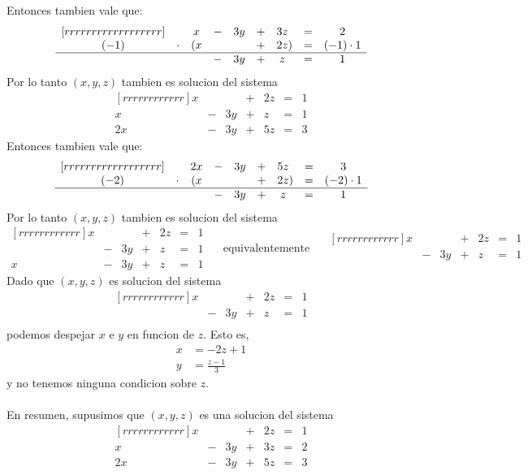 \documentclass{article}
\theoremstyle{definition}
\theoremstyle{definition}
\theoremstyle{remark}
\begin{document}
Entonces tambien vale que: 
\[
 \begin{matrix}[rrrrrrrrrrrrrrrrrr]
&& x & - & 3y & + & 3z\phantom{)} & = & 2 \\
    (-1) & \cdot &(x & &  & + & 2z ) & = & (-1) \cdot 1 \\
    \hline 
         & &  & - &  3y& + &  z\phantom{)} & = & 1
  \end{matrix}
\]
Por lo tanto $(x,y,z)$ tambien es solucion del sistema \[
\begin{matrix}[rrrrrrrrrrrr]
     x  &   &    & + & 2z & = & 1  \\
     x  & - & 3y & + & z & = & 1 \\
     2x & - & 3y & + & 5z & = & 3
  \end{matrix}
\]
Entonces tambien vale que: \[
 \begin{matrix}[rrrrrrrrrrrrrrrrrr]
&& 2x & - & 3y & + & 5z\phantom{)} & = & 3 \\
    (-2) & \cdot &(x & &  & + & 2z ) & = & (-2) \cdot 1 \\
    \hline 
         & &  & - &  3y& + &  z\phantom{)} & = & 1
  \end{matrix}
\]
Por lo tanto $(x,y,z)$ tambien es solucion del sistema \[
\begin{matrix}[rrrrrrrrrrrr]
     x  &   &    & + & 2z & = & 1  \\
       & - & 3y & + & z & = & 1 \\
    x & - & 3y & + & z & = & 1
  \end{matrix} \quad \text{ equivalentemente } \quad \begin{matrix}[rrrrrrrrrrrr]
     x  &   &    & + & 2z & = & 1  \\
       & - & 3y & + & z & = & 1 \\
     \end{matrix} 
\]
Dado que $(x,y,z)$ es solucion del sistema \[\begin{matrix}[rrrrrrrrrrrr]
     x  &   &    & + & 2z & = & 1  \\
       & - & 3y & + & z & = & 1 \\
     \end{matrix} 
\]
podemos despejar $x$ e $y$ en funcion de $z$. Esto es, \[
  \begin{aligned}
    x &=-2z+1 \\
    y&=\frac{z-1}{3}
  \end{aligned}
\]
y no tenemos ninguna condicion sobre $z$.
\\\\
En resumen, supusimos que $(x,y,z)$ es una solucion del sistema \[
\begin{matrix}[rrrrrrrrrrrr]
     x  &   &    & + & 2z & = & 1  \\
     x  & - & 3y & + & 3z & = & 2 \\
     2x & - & 3y & + & 5z & = & 3
  \end{matrix}
\]
\end{document}
